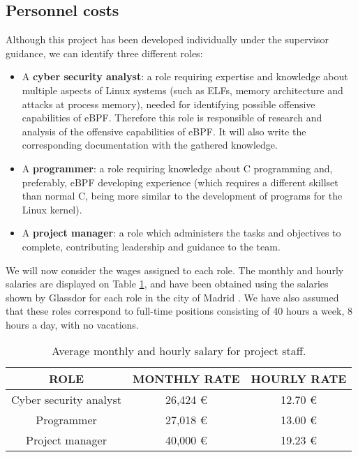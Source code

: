 \subsection{Personnel costs}
Although this project has been developed individually under the supervisor guidance, we can identify three different roles:
\begin{itemize}
\item A \textbf{cyber security analyst}: a role requiring expertise and knowledge about multiple aspects of Linux systems (such as ELFs, memory architecture and attacks at process memory), needed for identifying possible offensive capabilities of eBPF. Therefore this role is responsible of research and analysis of the offensive capabilities of eBPF. It will also write the corresponding documentation with the gathered knowledge.
\item A \textbf{programmer}: a role requiring knowledge about C programming and, preferably, eBPF developing experience (which requires a different skillset than normal C, being more similar to the development of programs for the Linux kernel).
\item A \textbf{project manager}: a role which administers the tasks and objectives to complete, contributing leadership and guidance to the team.
\end{itemize}

We will now consider the wages assigned to each role. The monthly and hourly salaries are displayed on Table \ref{table:salary_personnel}, and have been obtained using the salaries shown by Glassdor for each role in the city of Madrid \cite{glass_analyst} \cite{glass_manager} \cite{glass_programmer}. We have also assumed that these roles correspond to full-time positions consisting of 40 hours a week, 8 hours a day, with no vacations.

\begin{table}[htbp]
\begin{tabular}{|c|c|c|}
\hline
\textbf{ROLE} & \textbf{MONTHLY RATE} & \textbf{HOURLY RATE}\\
\hline
\hline
Cyber security analyst & 26,424 € & 12.70 € \\
\hline
Programmer & 27,018 € & 13.00 € \\
\hline
Project manager & 40,000 € & 19.23 € \\
\hline
\end{tabular}
\caption{Average monthly and hourly salary for project staff.}
\label{table:salary_personnel}
\end{table}

